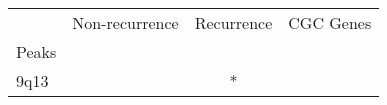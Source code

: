 \begin{tabular}{lccr}
\toprule
{} & Non-recurrence & Recurrence & CGC Genes \\
Peaks &                &            &           \\
\midrule
9q13  &                &          * &           \\
\bottomrule
\end{tabular}

